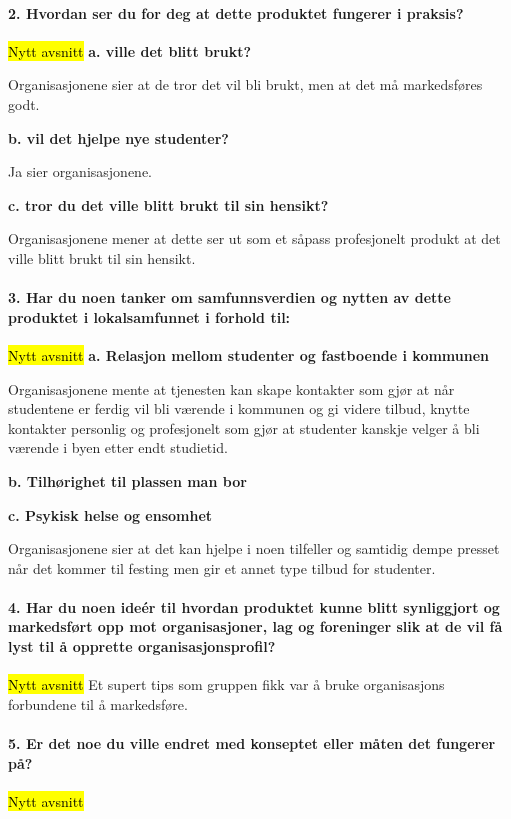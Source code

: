 \paragraph{2. Hvordan ser du for deg at dette produktet fungerer i praksis?}
\hl{Nytt avsnitt}
{\bf a. ville det blitt brukt?}

Organisasjonene sier at de tror det vil bli brukt, men at det må markedsføres godt.

{\bf b. vil det hjelpe nye studenter?}

Ja sier organisasjonene.

{\bf c. tror du det ville blitt brukt til sin hensikt?}

Organisasjonene mener at dette ser ut som et såpass profesjonelt produkt at det ville blitt brukt til sin hensikt.

\paragraph{3. Har du noen tanker om samfunnsverdien og nytten av dette produktet i lokalsamfunnet i forhold til:}
\hl{Nytt avsnitt}
{\bf a. Relasjon mellom studenter og fastboende i kommunen}

Organisasjonene mente at tjenesten kan skape kontakter som gjør at når studentene er ferdig vil bli værende i kommunen og gi videre tilbud, knytte kontakter personlig og profesjonelt som gjør at studenter kanskje velger å bli værende i byen etter endt studietid.

{\bf b. Tilhørighet til plassen man bor}



{\bf c. Psykisk helse og ensomhet}

Organisasjonene sier at det kan hjelpe i noen tilfeller og samtidig dempe presset når det kommer til festing men gir et annet type tilbud for studenter.

\paragraph{4. Har du noen ideér til hvordan produktet kunne blitt synliggjort og markedsført opp mot organisasjoner, lag og foreninger slik at de vil få lyst til å opprette organisasjonsprofil?}
\hl{Nytt avsnitt}
Et supert tips som gruppen fikk var å bruke organisasjons forbundene til å markedsføre.

\paragraph{5. Er det noe du ville endret med konseptet eller måten det fungerer på?}
\hl{Nytt avsnitt}

